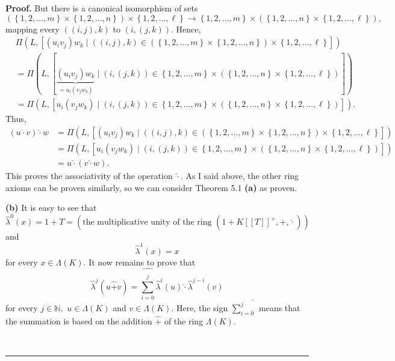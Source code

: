 \documentclass[numbers=enddot,12pt,final,onecolumn,notitlepage]{scrartcl}%
\newenvironment{proof}[1][Proof]{\noindent\textbf{#1.} }{\ \rule{0.5em}{0.5em}}
\begin{document}
\begin{proof}
But there is a canonical isomorphism of sets%
\[
\left(  \left\{  1,2,...,m\right\}  \times\left\{  1,2,...,n\right\}  \right)
\times\left\{  1,2,...,\ell\right\}  \rightarrow\left\{  1,2,...,m\right\}
\times\left(  \left\{  1,2,...,n\right\}  \times\left\{  1,2,...,\ell\right\}
\right)  ,
\]
mapping every $\left(  \left(  i,j\right)  ,k\right)  $ to $\left(  i,\left(
j,k\right)  \right)  $. Hence,%
\begin{align*}
&  \Pi\left(  L,\left[  \left(  u_{i}v_{j}\right)  w_{k}\mid\left(  \left(
i,j\right)  ,k\right)  \in\left(  \left\{  1,2,...,m\right\}  \times\left\{
1,2,...,n\right\}  \right)  \times\left\{  1,2,...,\ell\right\}  \right]
\right) \\
&  =\Pi\left(  L,\left[  \underbrace{\left(  u_{i}v_{j}\right)  w_{k}}%
_{=u_{i}\left(  v_{j}w_{k}\right)  }\mid\left(  i,\left(  j,k\right)  \right)
\in\left\{  1,2,...,m\right\}  \times\left(  \left\{  1,2,...,n\right\}
\times\left\{  1,2,...,\ell\right\}  \right)  \right]  \right) \\
&  =\Pi\left(  L,\left[  u_{i}\left(  v_{j}w_{k}\right)  \mid\left(  i,\left(
j,k\right)  \right)  \in\left\{  1,2,...,m\right\}  \times\left(  \left\{
1,2,...,n\right\}  \times\left\{  1,2,...,\ell\right\}  \right)  \right]
\right)  .
\end{align*}
Thus,%
\begin{align*}
\left(  u\widehat{\cdot}v\right)  \widehat{\cdot}w  &  =\Pi\left(  L,\left[
\left(  u_{i}v_{j}\right)  w_{k}\mid\left(  \left(  i,j\right)  ,k\right)
\in\left(  \left\{  1,2,...,m\right\}  \times\left\{  1,2,...,n\right\}
\right)  \times\left\{  1,2,...,\ell\right\}  \right]  \right) \\
&  =\Pi\left(  L,\left[  u_{i}\left(  v_{j}w_{k}\right)  \mid\left(  i,\left(
j,k\right)  \right)  \in\left\{  1,2,...,m\right\}  \times\left(  \left\{
1,2,...,n\right\}  \times\left\{  1,2,...,\ell\right\}  \right)  \right]
\right) \\
&  =u\widehat{\cdot}\left(  v\widehat{\cdot}w\right)  .
\end{align*}
This proves the associativity of the operation $\widehat{\cdot}$. As I said
above, the other ring axioms can be proven similarly, so we can consider
Theorem 5.1 \textbf{(a)} as proven.

\textbf{(b)} It is easy to see that
\[
\widehat{\lambda}^{0}\left(  x\right)  =1+T=\left(  \text{the multiplicative
unity of the ring }\left(  1+K\left[  \left[  T\right]  \right]
^{+},\widehat{+},\widehat{\cdot}\right)  \right)
\]
and
\[
\widehat{\lambda}^{1}\left(  x\right)  =x
\]
for every $x\in\Lambda\left(  K\right)  $. It now remains to prove that%
\begin{equation}
\widehat{\lambda}^{j}\left(  u\widehat{+}v\right)  =\widehat{\sum_{i=0}^{j}%
}\widehat{\lambda}^{i}\left(  u\right)  \widehat{\cdot}\widehat{\lambda}%
^{j-i}\left(  v\right)  \label{SpezLemma1}%
\end{equation}
for every $j\in\mathbb{N},$ $u\in\Lambda\left(  K\right)  $ and $v\in
\Lambda\left(  K\right)  .$ Here, the sign $\widehat{\sum\limits_{i=0}^{j}}$
means that the summation is based on the addition $\widehat{+}$ of the ring
$\Lambda\left(  K\right)  $.


\end{proof}
\end{document}
